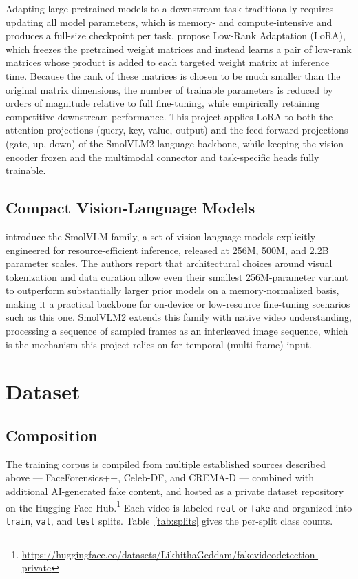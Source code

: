 \documentclass[acmsmall,review=false]{acmart}
\begin{document}
Adapting large pretrained models to a downstream task traditionally requires
updating all model parameters, which is memory- and compute-intensive and
produces a full-size checkpoint per task. \citet{hu2021lora} propose Low-Rank
Adaptation (LoRA), which freezes the pretrained weight matrices and instead
learns a pair of low-rank matrices whose product is added to each targeted
weight matrix at inference time. Because the rank of these matrices is chosen
to be much smaller than the original matrix dimensions, the number of trainable
parameters is reduced by orders of magnitude relative to full fine-tuning, while
empirically retaining competitive downstream performance. This project applies
LoRA to both the attention projections (query, key, value, output) and the
feed-forward projections (gate, up, down) of the SmolVLM2 language backbone,
while keeping the vision encoder frozen and the multimodal connector and
task-specific heads fully trainable.

\subsection{Compact Vision-Language Models}

\citet{marafioti2025smolvlm} introduce the SmolVLM family, a set of
vision-language models explicitly engineered for resource-efficient inference,
released at 256M, 500M, and 2.2B parameter scales. The authors report that
architectural choices around visual tokenization and data curation allow even
their smallest 256M-parameter variant to outperform substantially larger prior
models on a memory-normalized basis, making it a practical backbone for
on-device or low-resource fine-tuning scenarios such as this one. SmolVLM2
extends this family with native video understanding, processing a sequence of
sampled frames as an interleaved image sequence, which is the mechanism this
project relies on for temporal (multi-frame) input.

\section{Dataset}
\label{sec:dataset}

\subsection{Composition}

The training corpus is compiled from multiple established sources described
above --- FaceForensics++, Celeb-DF, and CREMA-D --- combined with additional
AI-generated fake content, and hosted as a private dataset repository on the
Hugging Face Hub.\footnote{\url{https://huggingface.co/datasets/LikhithaGeddam/fakevideodetection-private}}
Each video is labeled \texttt{real} or \texttt{fake} and organized into
\texttt{train}, \texttt{val}, and \texttt{test} splits. Table~\ref{tab:splits}
gives the per-split class counts.
\end{document}
